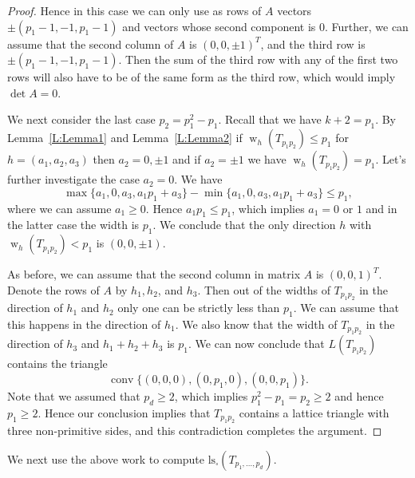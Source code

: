 \documentclass[11pt]{amsart}
\numberwithin{equation}{section}
\theoremstyle{plain}
\theoremstyle{definition}
\newcommand{\conv}{\operatorname{conv}}
\newcommand{\w}{\operatorname{w}}
\newcommand{\lss}{\operatorname{ls_\square}}
\begin{document}
\begin{proof}
Hence  in this case we can only use as rows of $A$ vectors $\pm (p_1-1,-1,p_1-1)$ and vectors whose second component is 0.
Further, we can assume that the second column of $A$ is $(0,0,\pm 1)^T$, and the third row is $\pm (p_1-1,-1,p_1-1)$.
Then the sum of the third row with any of the first two rows will also have to be of the same form as the third row, which would imply $\det A=0$.

We next consider the last case $p_2=p_1^2-p_1$. Recall that we have $k+2=p_1$. By Lemma~\ref{L:Lemma1} and Lemma~\ref{L:Lemma2} if $\w_h(T_{p_1p_2})\leq p_1$ for 
$h=(a_1,a_2,a_3)$ then $a_2=0,\pm 1$ and if $a_2=\pm 1$ we have $\w_h(T_{p_1p_2})= p_1$. Let's further investigate the case $a_2=0$. We have 
$$\max\{a_1,0,a_3,a_1p_1+a_3\}-\min\{a_1,0,a_3,a_1p_1+a_3\}\le p_1,
$$
where we can assume $a_1\geq 0$. Hence $a_1p_1\leq p_1$, which implies $a_1=0$ or $1$ and in the latter case the width is $p_1$. We conclude that the only direction $h$ with $\w_h(T_{p_1p_2})< p_1$ is 
$(0,0,\pm 1)$.

As before, we can assume that the second column in matrix $A$ is $(0,0,1)^T$. Denote the rows of $A$ by $h_1,h_2$, and $h_3$.
Then out of the widths of $T_{p_1p_2}$ in the direction of  $h_1$ and $h_2$ only one can be strictly less than $p_1$.
We can assume that this happens in the direction of $h_1$. We also know that the width of $T_{p_1p_2}$ in the direction of $h_3$ and $h_1+h_2+h_3$
is $p_1$. We can now conclude that $L(T_{p_1p_2})$ contains the triangle 
$$\conv\{(0,0,0), (0,p_1,0), (0,0,p_1)\}.
$$
Note that we assumed that $p_d\geq 2$, which implies $p_1^2-p_1=p_2\geq 2$ and hence $p_1\geq 2$. Hence our conclusion implies  that  $T_{p_1p_2}$ contains a lattice triangle with three 
non-primitive sides, and this contradiction completes the argument.
\end{proof}

We next use the above work  to compute $\lss(T_{p_1,\dots, p_d})$.
\end{document}
